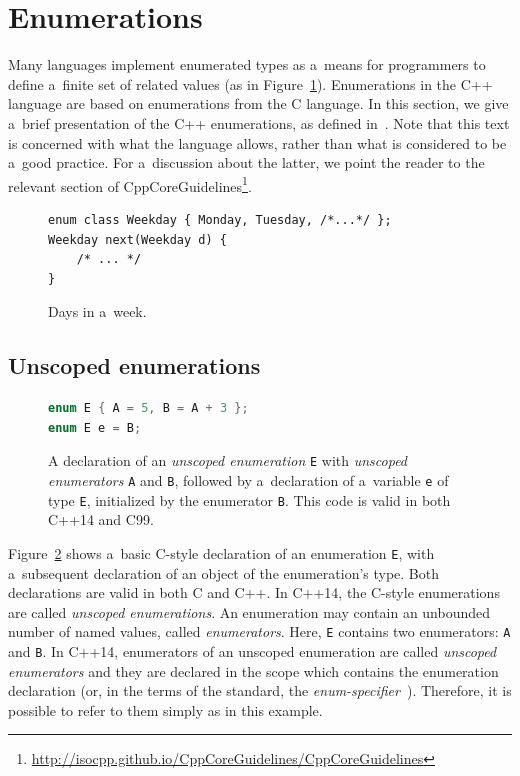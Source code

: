 \documentclass[nolot,nolof,nocover,printed]{fithesis3}
\newcommand{\stdN}[2]{\cite[#2]{#1}\xspace}
\begin{document}
\section{Enumerations}

Many languages implement enumerated types as a~means for programmers to define a~finite set of related values (as in Figure~\ref{fig:daysInWeek}). Enumerations in the C++ language are based on enumerations from the C language. In this section, we give a~brief presentation of the C++ enumerations, as defined in~\cite{n4296}. Note that this text is concerned with what the language allows, rather than what is considered to be a~good practice. For a~discussion about the latter, we point the reader to the relevant section of CppCoreGuidelines\footnote{\url{http://isocpp.github.io/CppCoreGuidelines/CppCoreGuidelines}}. 

\begin{figure}[ht]
\begin{lstlisting}
enum class Weekday { Monday, Tuesday, /*...*/ };
Weekday next(Weekday d) {
    /* ... */
}
\end{lstlisting}
\caption{Days in a~week.}
\label{fig:daysInWeek}
\end{figure}

\subsection{Unscoped enumerations}

\begin{figure}
\begin{lstlisting}[language=C++]
enum E { A = 5, B = A + 3 };
enum E e = B;
\end{lstlisting}
\caption{A declaration of an \textit{unscoped enumeration} \lstinline|E| with \textit{unscoped enumerators} \lstinline|A| and \lstinline|B|, followed by a~declaration of a~variable \lstinline|e| of type \lstinline|E|, initialized by the enumerator \lstinline|B|. This code is valid in both C++14 and C99.}
\label{CStyleEnumDeclaration}
\end{figure}

Figure~\ref{CStyleEnumDeclaration} shows a~basic C-style declaration of an enumeration \lstinline|E|, with a~subsequent declaration of an object of the enumeration's type. Both declarations are valid in both C and C++. In C++14, the C-style enumerations are called \textit{unscoped enumerations}. An enumeration may contain an unbounded number of named values, called \textit{enumerators}. Here, \lstinline|E| contains two enumerators: \lstinline|A| and \lstinline|B|. In C++14, enumerators of an unscoped enumeration are called \textit{unscoped enumerators} and they are declared in the scope which contains the enumeration declaration (or, in the terms of the standard, the \textit{enum-specifier}~\stdN{n4296}{\S 7.2/11}). Therefore, it is possible to refer to them simply as in this example.
\end{document}
